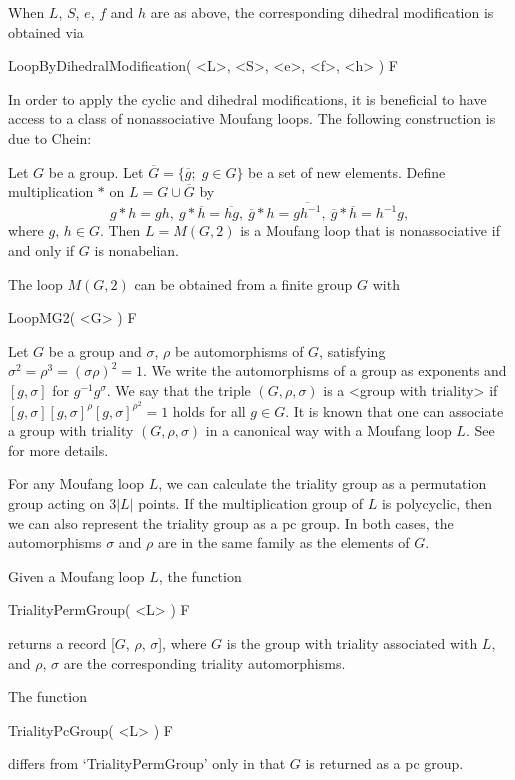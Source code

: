When $L$, $S$, $e$, $f$ and $h$ are as above, the corresponding dihedral
modification is obtained via

\>LoopByDihedralModification( <L>, <S>, <e>, <f>, <h> ) F

In order to apply the cyclic and dihedral modifications, it is beneficial to
have access to a class of nonassociative Moufang loops. The following
construction is due to Chein:

Let $G$ be a group. Let $\overline{G}=\{\overline{g};\;g\in G\}$ be a set of
new elements. Define multiplication $\ast$ on $L=G\cup \overline{G}$ by
$$
    g\ast h = gh,\ g\ast\overline{h}=\overline{hg},\
    \overline{g}\ast h = \overline{gh^{-1}},\
    \overline{g}\ast \overline{h}=h^{-1}g,
$$
where $g$, $h\in G$. Then $L=M(G,2)$ is a Moufang loop that is nonassociative
if and only if $G$ is nonabelian.

The loop $M(G,2)$ can be obtained from a finite group $G$ with

\>LoopMG2( <G> ) F


Let $G$ be a group and $\sigma$, $\rho$ be automorphisms of $G$, satisfying
$\sigma^2 = \rho^3 = (\sigma \rho)^2 = 1$. We write the automorphisms of a
group as exponents and $[g,\sigma]$ for $g^{-1}g^\sigma$. We say that the
triple $(G,\rho,\sigma)$ is a <group with triality>
%
%
 if $[g, \sigma]
[g,\sigma]^\rho [g,\sigma]^{\rho^2} =1$ holds for all $g \in G$. It is known
that one can associate a group with triality $(G,\rho,\sigma)$ in a canonical
way with a Moufang loop $L$. See \cite{NV} for more details.

For any Moufang loop $L$, we can calculate the triality group as a permutation
group acting on $3|L|$ points. If the multiplication group of $L$ is
polycyclic, then we can also represent the triality group as a pc group. In
both cases, the automorphisms $\sigma$ and $\rho$ are in the same family as the
elements of $G$.

Given a Moufang loop $L$, the function

\>TrialityPermGroup( <L> ) F

returns a record [$G$, $\rho$, $\sigma$], where $G$ is the group with triality
associated with $L$, and $\rho$, $\sigma$ are the corresponding triality
automorphisms.

The function

\>TrialityPcGroup( <L> ) F

differs from `TrialityPermGroup' only in that $G$ is returned as a pc group.
